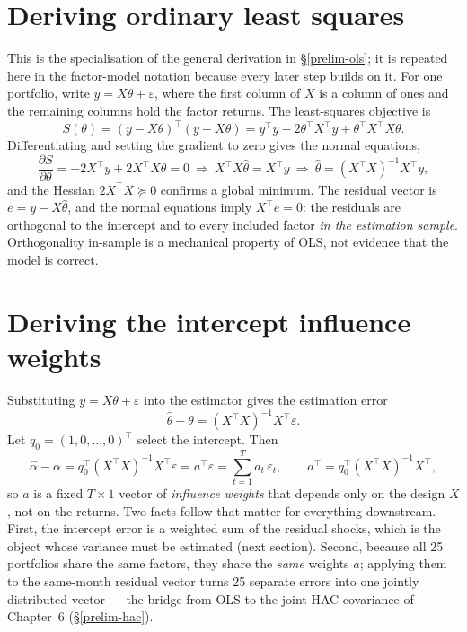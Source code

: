\hypertarget{deriving-ordinary-least-squares}{%
\section{Deriving ordinary least
squares}\label{deriving-ordinary-least-squares}}

This is the specialisation of the general derivation in \S\ref{prelim-ols};
it is repeated here in the factor-model notation because every later step
builds on it. For one portfolio, write $y=X\theta+\varepsilon$, where the
first column of $X$ is a column of ones and the remaining columns hold the
factor returns. The least-squares objective is
\begin{equation}\label{eq:rss}
S(\theta) = (y-X\theta)^{\top}(y-X\theta)
          = y^{\top}y - 2\theta^{\top}X^{\top}y + \theta^{\top}X^{\top}X\theta .
\end{equation}
Differentiating and setting the gradient to zero gives the normal
equations,
\begin{equation}\label{eq:normal-eq}
\frac{\partial S}{\partial\theta} = -2X^{\top}y + 2X^{\top}X\theta = 0
\ \Longrightarrow\ X^{\top}X\hat\theta = X^{\top}y
\ \Longrightarrow\ \hat\theta = (X^{\top}X)^{-1}X^{\top}y,
\end{equation}
and the Hessian $2X^{\top}X\succeq 0$ confirms a global minimum. The
residual vector is $e=y-X\hat\theta$, and the normal equations imply
$X^{\top}e=0$: the residuals are orthogonal to the intercept and to every
included factor \emph{in the estimation sample}. Orthogonality in-sample
is a mechanical property of OLS, not evidence that the model is correct.

\hypertarget{deriving-the-intercept-influence-weights}{%
\section{Deriving the intercept influence
weights}\label{deriving-the-intercept-influence-weights}}

Substituting $y=X\theta+\varepsilon$ into the estimator gives the
estimation error
\begin{equation}\label{eq:est-error}
\hat\theta-\theta = (X^{\top}X)^{-1}X^{\top}\varepsilon .
\end{equation}
Let $q_0=(1,0,\dots,0)^{\top}$ select the intercept. Then
\begin{equation}\label{eq:ch5-influence}
\hat\alpha-\alpha = q_0^{\top}(X^{\top}X)^{-1}X^{\top}\varepsilon
= a^{\top}\varepsilon = \sum_{t=1}^{T} a_t\,\varepsilon_t,
\qquad a^{\top}=q_0^{\top}(X^{\top}X)^{-1}X^{\top},
\end{equation}
so $a$ is a fixed $T\times1$ vector of \emph{influence weights} that
depends only on the design $X$, not on the returns. Two facts follow that
matter for everything downstream. First, the intercept error is a
weighted sum of the residual shocks, which is the object whose variance
must be estimated (next section). Second, because all 25 portfolios share
the same factors, they share the \emph{same} weights $a$; applying them to
the same-month residual vector turns 25 separate errors into one jointly
distributed vector --- the bridge from OLS to the joint HAC covariance of
Chapter~6 (\S\ref{prelim-hac}).

